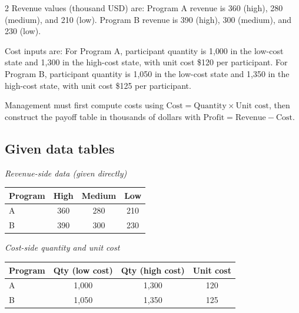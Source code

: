 \documentclass[12pt]{article}
\begin{document}
\begin{multicols}{2}
				Revenue values (thousand USD) are:
				Program A revenue is 360 (high), 280 (medium), and 210 (low).
				Program B revenue is 390 (high), 300 (medium), and 230 (low).
				
				Cost inputs are:
				For Program A, participant quantity is 1{,}000 in the low-cost state and 1{,}300 in the high-cost state, with unit cost \$120 per participant.
				For Program B, participant quantity is 1{,}050 in the low-cost state and 1{,}350 in the high-cost state, with unit cost \$125 per participant.
				
				Management must first compute costs using
				\(\text{Cost}=\text{Quantity}\times\text{Unit cost}\), then construct the payoff table in thousands of dollars with
				\(\text{Profit}=\text{Revenue}-\text{Cost}\).
				\subsection*{Given data tables}
				\begin{center}
					\begin{minipage}[t]{0.48\linewidth}
						\textit{Revenue-side data (given directly)}
						\begin{center}
							\begin{tabular}{l c c c}
								\toprule
								Program & High & Medium & Low \\
								\midrule
								A & 360 & 280 & 210 \\
								B & 390 & 300 & 230 \\
								\bottomrule
							\end{tabular}
						\end{center}
					\end{minipage}
					\hfill
					\begin{minipage}[t]{0.48\linewidth}
						\textit{Cost-side quantity and unit cost}
						\begin{center}
							\begin{tabular}{l c c c}
								\toprule
								Program & Qty (low cost) & Qty (high cost) & Unit cost \\
								\midrule
								A & 1{,}000 & 1{,}300 & 120 \\
								B & 1{,}050 & 1{,}350 & 125 \\
								\bottomrule
							\end{tabular}
						\end{center}
					\end{minipage}
				\end{center}


\end{multicols}
\end{document}
